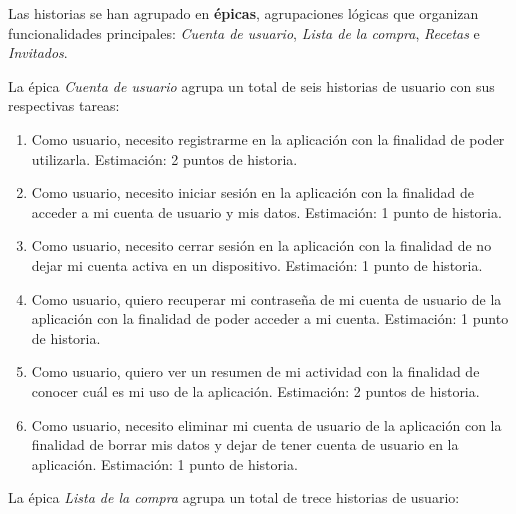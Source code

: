 Las historias se han agrupado en \textbf{épicas}, agrupaciones lógicas que organizan funcionalidades principales: \textit{Cuenta de usuario}, \textit{Lista de la compra}, \textit{Recetas} e \textit{Invitados}.

La épica \textit{Cuenta de usuario} agrupa un total de seis historias de usuario con sus respectivas tareas:

\begin{enumerate}
  \item Como usuario, necesito registrarme en la aplicación con la finalidad de poder utilizarla. Estimación: 2 puntos de historia.
  \item Como usuario, necesito iniciar sesión en la aplicación con la finalidad de acceder a mi cuenta de usuario y mis datos. Estimación: 1 punto de historia.
  \item Como usuario, necesito cerrar sesión en la aplicación con la finalidad de no dejar mi cuenta activa en un dispositivo. Estimación: 1 punto de historia.
  \item Como usuario, quiero recuperar mi contraseña de mi cuenta de usuario de la aplicación con la finalidad de poder acceder a mi cuenta. Estimación: 1 punto de historia.
  \item Como usuario, quiero ver un resumen de mi actividad con la finalidad de conocer cuál es mi uso de la aplicación. Estimación: 2 puntos de historia.
  \item Como usuario, necesito eliminar mi cuenta de usuario de la aplicación con la finalidad de borrar mis datos y dejar de tener cuenta de usuario en la aplicación. Estimación: 1 punto de historia.
\end{enumerate}

La épica \textit{Lista de la compra} agrupa un total de trece historias de usuario:

